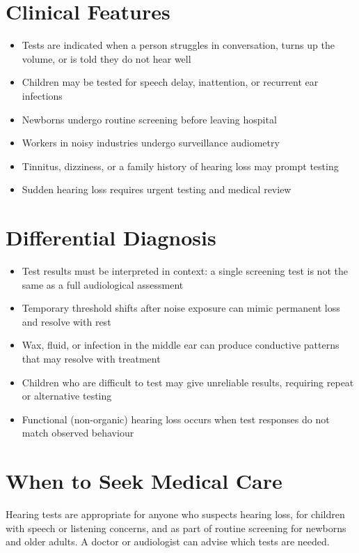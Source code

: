 \section*{Clinical Features}
\begin{itemize}
    \item Tests are indicated when a person struggles in conversation, turns up the volume, or is told they do not hear well
    \item Children may be tested for speech delay, inattention, or recurrent ear infections
    \item Newborns undergo routine screening before leaving hospital
    \item Workers in noisy industries undergo surveillance audiometry
    \item Tinnitus, dizziness, or a family history of hearing loss may prompt testing
    \item Sudden hearing loss requires urgent testing and medical review
\end{itemize}

\section*{Differential Diagnosis}
\begin{itemize}
    \item Test results must be interpreted in context: a single screening test is not the same as a full audiological assessment
    \item Temporary threshold shifts after noise exposure can mimic permanent loss and resolve with rest
    \item Wax, fluid, or infection in the middle ear can produce conductive patterns that may resolve with treatment
    \item Children who are difficult to test may give unreliable results, requiring repeat or alternative testing
    \item Functional (non-organic) hearing loss occurs when test responses do not match observed behaviour
\end{itemize}

\section*{When to Seek Medical Care}
Hearing tests are appropriate for anyone who suspects hearing loss, for children with speech or listening concerns, and as part of routine screening for newborns and older adults. A doctor or audiologist can advise which tests are needed.


